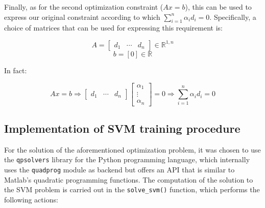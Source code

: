 \documentclass[letterpaper,headings=standardclasses]{scrartcl}
\begin{document}
Finally, as for the second optimization constraint ($Ax = b$), this can be used to express our original constraint according to which $\sum_{i = 1}^n \alpha_i d_i = 0$. Specifically, a choice of matrices that can be used for expressing this requirement is:

$$ A = \left[ \begin{matrix} d_1 & \cdots & d_n \end{matrix} \right] \in \mathbb{R}^{1,n} $$
$$ b = [0] \in \mathbb{R} $$

In fact:

$$ Ax = b \Rightarrow \left[ \begin{matrix} d_1 & \cdots & d_n \end{matrix} \right] \left[ \begin{matrix} \alpha_1 \\ \vdots \\ \alpha_n \end{matrix} \right] = 0 \Rightarrow \sum_{i = 1}^n \alpha_i d_i = 0 $$

\subsection{Implementation of SVM training procedure}

For the solution of the aforementioned optimization problem, it was chosen to use the \texttt{qpsolvers} library for the Python programming language, which internally uses the \texttt{quadprog} module as backend but offers an API that is similar to Matlab's quadratic programming functions. The computation of the solution to the SVM problem is carried out in the \texttt{solve\_svm()} function, which performs the following actions:
\end{document}

